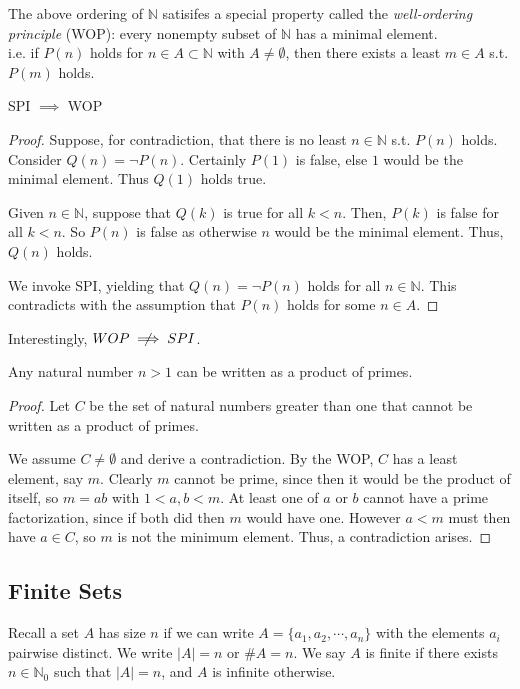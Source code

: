 \documentclass[12pt]{article}
\begin{document}
The above ordering of $\mathbb{N}$ satisifes
a special property called the \emph{well-ordering principle} (WOP):
every nonempty subset of $\mathbb{N}$ has a minimal element.\\
i.e. if $P(n)$ holds for $n \in A \subset \mathbb{N}$ with $A \ne \emptyset$,
then there exists a least $m \in A$ s.t. $P(m)$ holds.

\begin{theorem}
    SPI $\implies$ WOP
\end{theorem}
\begin{proof}
    Suppose, for contradiction, that
    there is no least $n \in \mathbb{N}$ s.t. $P(n)$ holds.
    Consider $Q(n) = \neg P(n).$
    Certainly $P(1)$ is false, else $1$ would be the minimal element.
    Thus $Q(1)$ holds true.
    
    Given $n \in \mathbb{N}$, suppose that $Q(k)$ is true
    for all $k < n$.
    Then, $P(k)$ is false for all $k < n$.
    So $P(n)$ is false as otherwise $n$ would
    be the minimal element.
    Thus, $Q(n)$ holds.

    We invoke SPI, yielding that $Q(n) = \neg P(n)$
    holds for all $n \in \mathbb{N}$.
    This contradicts with the assumption that
    $P(n)$ holds for some $n \in A$.
\end{proof}

Interestingly, $WOP \centernot\implies SPI$.

\begin{theorem}
    Any natural number $n > 1$ can be written as a product of primes.
\end{theorem}
\begin{proof}
    Let $C$ be the set of natural numbers
    greater than one that cannot be written as a product of primes.

    We assume $C \ne \emptyset$ and derive a contradiction.
    By the WOP, $C$ has a least element, say $m$.
    Clearly $m$ cannot be prime, since then it would
    be the product of itself,
    so $m = ab$ with $1 < a,b < m$. At least
    one of $a$ or $b$ cannot have a prime factorization,
    since if both did then $m$ would have one.
    However $a < m$ must then have $a \in C$,
    so $m$ is not the minimum element. 
    Thus, a contradiction arises.
\end{proof}

\subsection{Finite Sets}
Recall a set $A$ has size $n$ if
we can write $A = \{a_{1},a_{2},\cdots,a_n\}$ 
with the elements $a_i$ pairwise distinct.
We write $|A| = n$ or $\#A = n$.
We say $A$ is finite if there exists $n \in \mathbb{N}_0$
such that $|A| = n$, and $A$ is infinite otherwise.
\end{document}
